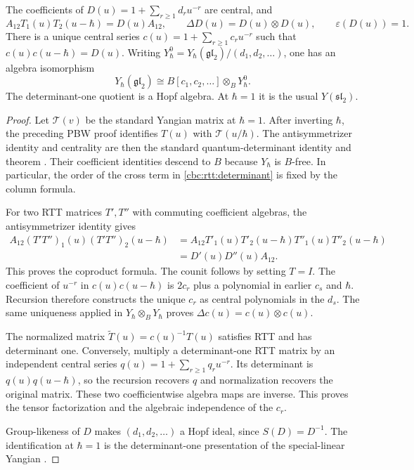 \begin{proposition}\label{cbc:rtt:qdet}
The coefficients of $D(u)=1+\sum_{r\geq1}d_ru^{-r}$ are central, and
\[
 A_{12}T_1(u)T_2(u-\hbar)=D(u)A_{12},\qquad
 \Delta D(u)=D(u)\otimes D(u),\qquad \varepsilon(D(u))=1.
\]
There is a unique central series $c(u)=1+\sum_{r\geq1}c_ru^{-r}$
such that $c(u)c(u-\hbar)=D(u)$.  Writing
$Y_\hbar^0=Y_\hbar(\mathfrak{gl}_2)/(d_1,d_2,\ldots)$, one has
an algebra isomorphism
\[
 Y_\hbar(\mathfrak{gl}_2)
 \cong B[c_1,c_2,\ldots]\otimes_B Y_\hbar^0.
\]
The determinant-one quotient is a Hopf algebra.  At $\hbar=1$ it is
the usual $Y(\mathfrak{sl}_2)$.
\end{proposition}
\begin{proof}
Let $\mathcal T(v)$ be the standard Yangian matrix at $\hbar=1$.
After inverting $\hbar$, the preceding PBW proof identifies
$T(u)$ with $\mathcal T(u/\hbar)$.
The antisymmetrizer identity and centrality are then the standard
quantum-determinant identity and theorem
\cite[\S2.1 and Theorem~2.10]{MNOYangians}.
Their coefficient identities descend to $B$ because $Y_\hbar$ is
$B$-free.  In particular, the order of the cross term in
\eqref{cbc:rtt:determinant} is fixed by the column formula.

For two RTT matrices $T',T''$ with commuting coefficient algebras,
the antisymmetrizer identity gives
\begin{align*}
 A_{12}(T'T'')_1(u)(T'T'')_2(u-\hbar)
 &=A_{12}T'_1(u)T'_2(u-\hbar)T''_1(u)T''_2(u-\hbar)\\
 &=D'(u)D''(u)A_{12}.
\end{align*}
This proves the coproduct formula.  The counit follows by setting $T=I$.
The coefficient of $u^{-r}$ in $c(u)c(u-\hbar)$ is $2c_r$ plus a
polynomial in earlier $c_s$ and $\hbar$.  Recursion therefore constructs
the unique $c_r$ as central polynomials in the $d_s$.
The same uniqueness applied in $Y_\hbar\otimes_B Y_\hbar$ proves
$\Delta c(u)=c(u)\otimes c(u)$.

The normalized matrix $\widetilde T(u)=c(u)^{-1}T(u)$ satisfies RTT
and has determinant one.  Conversely, multiply a determinant-one RTT
matrix by an independent central series $q(u)=1+\sum_{r\geq1}q_ru^{-r}$.
Its determinant is $q(u)q(u-\hbar)$, so the recursion recovers $q$ and
normalization recovers the original matrix.  These two coefficientwise
algebra maps are inverse.  This proves the tensor factorization and the
algebraic independence of the $c_r$.

Group-likeness of $D$ makes
$(d_1,d_2,\ldots)$ a Hopf ideal, since $S(D)=D^{-1}$.
The identification at $\hbar=1$ is the determinant-one presentation
of the special-linear Yangian \cite[Theorem~2.21]{MolevYangianApplications}.
\end{proof}

